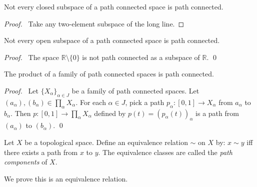 \begin{cor}
Not every closed subspace of a path connected space is path connected.
\end{cor}

\begin{proof}
\pf\ Take any two-element subspace of the long line.
\end{proof}

\begin{cor}
Not every open subspace of a path connected space is path connected.
\end{cor}

\begin{proof}
\pf\ The space $\mathbb{R} \setminus \{ 0 \}$ is not path connected as a subspace of $\mathbb{R}$. \qed
\end{proof}

\begin{prop}[AC]
  \label{prop:topology:path_connected:product}
  The product of a family of path connected spaces is path connected.
\end{prop}

\begin{proof}
  \pf\ Let $\{ X_\alpha \}_{\alpha \in J}$ be a family of path connected spaces. Let $(a_\alpha), (b_\alpha) \in \prod_\alpha X_\alpha$. For each $\alpha \in J$, pick a path $p_\alpha : [0,1] \rightarrow X_\alpha$ from $a_\alpha$ to $b_\alpha$. Then $p : [0,1] \rightarrow \prod_\alpha X_\alpha$ defined by $p(t) = (p_\alpha(t))_\alpha$ is a path from $(a_\alpha)$ to $(b_\alpha)$. \qed
\end{proof}
\begin{df}
  Let $X$ be a topological space. Define an equivalence relation $\sim$ on
  $X$
  by: $x \sim y$ iff there exists a path from $x$ to $y$. The equivalence
  classes  are called the \emph{path components} of $X$.

  We prove this is an equivalence relation.
\end{df}

